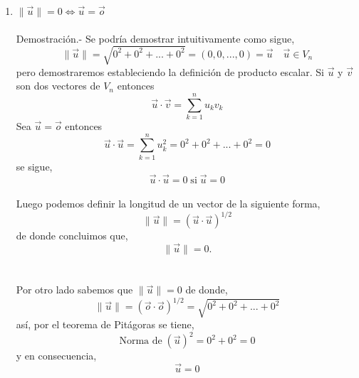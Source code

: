 \begin{enumerate}
\item $\|\vec{u}\|=0 \Leftrightarrow \vec{u} = \vec{o}$\\\\
    Demostración.-\; Se podría demostrar intuitivamente como sigue,
    $$\|\vec{u}\|=\sqrt{0^2+0^2+...+0^2} = (0,0,...,0) = \vec{u} \quad \vec{u}\in V_n$$ 
    pero demostraremos  estableciendo la definición de producto escalar.
    Si $\vec{u}$ y $\vec{v}$ son dos vectores de $V_n$ entonces $$\vec{u}\cdot \vec{v} = \sum_{k=1}^n u_k v_k$$
    Sea $\vec{u}=\vec{o}$ entonces $$\vec{u}\cdot \vec{u} = \sum\limits_{k=1}^n u_k^2 = 0^2+0^2 + ... +0^2 = 0 $$
   se sigue, $$\vec{u}\cdot\vec{u}=0\; \mbox{si} \; \vec{u}=0$$\\
   Luego podemos definir la longitud de un vector de la siguiente forma, $$\|\vec{u}\| = (\vec{u}\cdot\vec{u})^{1/2}$$ de donde concluimos que, $$\|\vec{u}\|=0.$$\\\\
   Por otro lado sabemos que $\|\vec{u}\|=0$ de donde, $$\|\vec{u}\| = (\vec{o}\cdot\vec{o})^{1/2} =  \sqrt{0^2 + 0^2 + ... + 0^2}$$
   así, por el teorema de Pitágoras se tiene, $$\mbox{Norma de} \; (\vec{u})^2 = 0^2+ 0^2 = 0$$
   y en consecuencia, $$\vec{u}=0$$\\
   
\end{enumerate}

